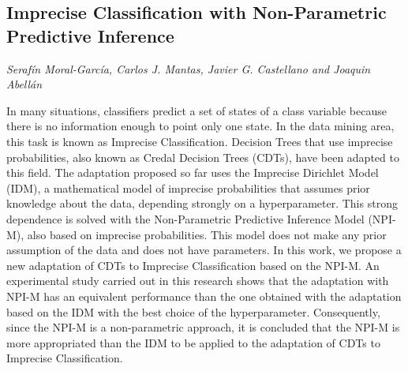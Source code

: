 \documentclass[../booklet.tex]{subfiles}
\begin{document}
\subsection[Imprecise Classification with Non-Parametric Predictive Inference. {\it Serafín Moral-García, Carlos J. Mantas, Javier G. Castellano and Joaquin Abellán}]{Imprecise Classification with Non-Parametric Predictive Inference}
   

\begin{center}
  {\it Serafín Moral-García, Carlos J. Mantas, Javier G. Castellano and Joaquin Abellán}
\end{center}




In many situations, classifiers predict a set of states of a class variable because there is no information enough to point only one state. In the data mining area, this task is known as Imprecise Classification. Decision Trees that use imprecise probabilities, also known as Credal Decision Trees (CDTs), have been adapted to this field. The adaptation proposed so far uses the Imprecise Dirichlet Model (IDM), a mathematical model of imprecise probabilities that assumes prior knowledge about the data, depending strongly on a hyperparameter. This strong dependence is solved with the Non-Parametric Predictive Inference Model (NPI-M), also based on imprecise probabilities. This model does not make any prior assumption of the data and does not have parameters. In this work, we propose a new adaptation of CDTs to Imprecise Classification based on the NPI-M. An experimental study carried out in this research shows that the adaptation with NPI-M has an equivalent performance than the one obtained with the adaptation based on the IDM with the best choice of the hyperparameter.  Consequently, since the NPI-M is a non-parametric approach, it is concluded that the NPI-M is more appropriated than the IDM to be applied to the adaptation of CDTs to Imprecise Classification. 

\end{document}
